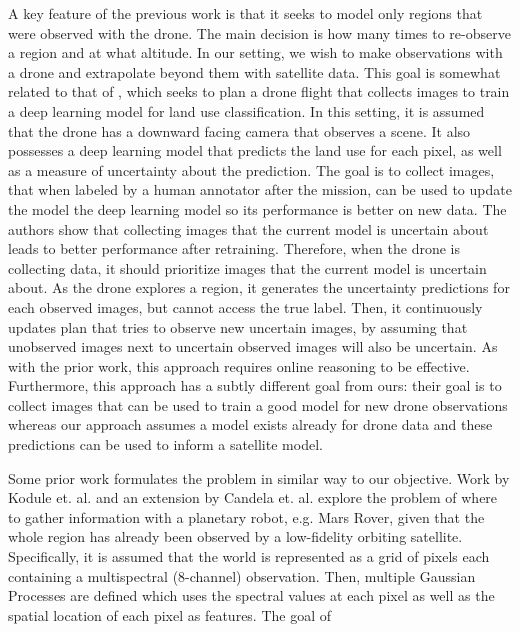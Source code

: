 A key feature of the previous work is that it seeks to model only regions that were observed with the drone. The main decision is how many times to re-observe a region and at what altitude. In our setting, we wish to make observations with a drone and extrapolate beyond them with satellite data. This goal is somewhat related to that of \cite{Ruckin2022}, which seeks to plan a drone flight that collects images to train a deep learning model for land use classification. In this setting, it is assumed that the drone has a downward facing camera that observes a scene. It also possesses a deep learning model that predicts the land use for each pixel, as well as a measure of uncertainty about the prediction. The goal is to collect images, that when labeled by a human annotator after the mission, can be used to update the model the deep learning model so its performance is better on new data. The authors show that collecting images that the current model is uncertain about leads to better performance after retraining. Therefore, when the drone is collecting data, it should prioritize images that the current model is uncertain about. As the drone explores a region, it generates the uncertainty predictions for each observed images, but cannot access the true label. Then, it continuously updates plan that tries to observe new uncertain images, by assuming that unobserved images next to uncertain observed images will also be uncertain. As with the prior work, this approach requires online reasoning to be effective. Furthermore, this approach has a subtly different goal from ours: their goal is to collect images that can be used to train a good model for new drone observations whereas our approach assumes a model exists already for drone data and these predictions can be used to inform a satellite model. 

Some prior work formulates the problem in similar way to our objective. Work by Kodule et. al. \cite{Kodgule2019Non-myopicMeasurements} and an extension by Candela et. al. \cite{Candela2020PlanetaryMapping} explore the problem of where to gather information with a planetary robot, e.g. Mars Rover, given that the whole region has already been observed by a low-fidelity orbiting satellite. Specifically, it is assumed that the world is represented as a grid of pixels each containing a multispectral (8-channel) observation. Then, multiple Gaussian Processes \cite{Rasmussen2004} are defined which uses the spectral values at each pixel as well as the spatial location of each pixel as features. The goal of 

